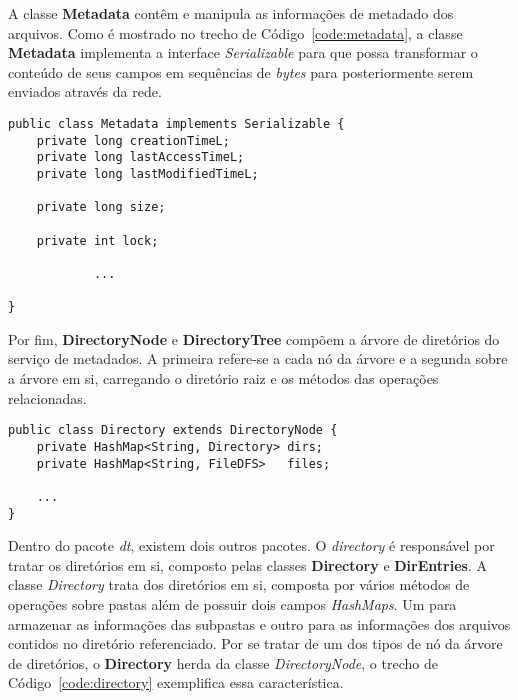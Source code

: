 A classe \textbf{Metadata} contêm e manipula as informações de metadado dos arquivos. Como é mostrado no trecho de Código~\ref{code:metadata}, a classe \textbf{Metadata} implementa a interface \textit{Serializable} para que possa transformar o conteúdo de seus campos em sequências de \textit{bytes} para posteriormente serem enviados através da rede.
\\

\begin{lstlisting}[basicstyle=\ttfamily\footnotesize, frame=single, caption=Classe Metadata, label=code:metadata]	
public class Metadata implements Serializable {
	private long creationTimeL;
	private long lastAccessTimeL;
	private long lastModifiedTimeL;
	
	private long size;
	
	private int lock;
	
			...
			
}
\end{lstlisting}	

Por fim, \textbf{DirectoryNode} e \textbf{DirectoryTree} compõem a árvore de diretórios do serviço de metadados. A primeira refere-se a cada nó da árvore e a segunda sobre a árvore em si, carregando o diretório raiz e os métodos das operações relacionadas.
\\

\begin{lstlisting}[basicstyle=\ttfamily\footnotesize, frame=single, caption=Declaração e os campos da classe Directory, label=code:directory]
public class Directory extends DirectoryNode {
	private HashMap<String, Directory> dirs;
	private HashMap<String, FileDFS>   files;
	
	...
}
\end{lstlisting}

Dentro do pacote \textit{dt}, existem dois outros pacotes. O \textit{directory} é responsável por tratar os diretórios em si, composto pelas classes \textbf{Directory} e \textbf{DirEntries}.
A classe \textit{Directory} trata dos diretórios em si, composta por vários métodos de operações sobre pastas além de possuir dois campos \textit{HashMaps}. Um para armazenar as informações das subpastas e outro para as informações dos arquivos contidos no diretório referenciado. Por se tratar de um dos tipos de nó da árvore de diretórios, o \textbf{Directory} herda da classe \textit{DirectoryNode}, o trecho de Código~\ref{code:directory} exemplifica essa característica.
\\

